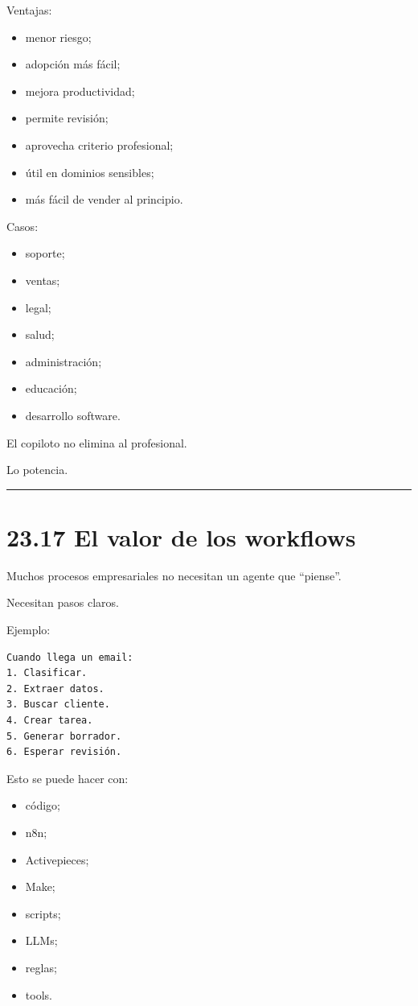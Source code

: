 Ventajas:

\begin{itemize}
\tightlist
\item
  menor riesgo;
\item
  adopción más fácil;
\item
  mejora productividad;
\item
  permite revisión;
\item
  aprovecha criterio profesional;
\item
  útil en dominios sensibles;
\item
  más fácil de vender al principio.
\end{itemize}

Casos:

\begin{itemize}
\tightlist
\item
  soporte;
\item
  ventas;
\item
  legal;
\item
  salud;
\item
  administración;
\item
  educación;
\item
  desarrollo software.
\end{itemize}

El copiloto no elimina al profesional.

Lo potencia.

\begin{center}\rule{0.5\linewidth}{0.5pt}\end{center}

\section{23.17 El valor de los
workflows}\label{el-valor-de-los-workflows}

Muchos procesos empresariales no necesitan un agente que ``piense''.

Necesitan pasos claros.

Ejemplo:

\begin{lstlisting}
Cuando llega un email:
1. Clasificar.
2. Extraer datos.
3. Buscar cliente.
4. Crear tarea.
5. Generar borrador.
6. Esperar revisión.
\end{lstlisting}

Esto se puede hacer con:

\begin{itemize}
\tightlist
\item
  código;
\item
  n8n;
\item
  Activepieces;
\item
  Make;
\item
  scripts;
\item
  LLMs;
\item
  reglas;
\item
  tools.
\end{itemize}

